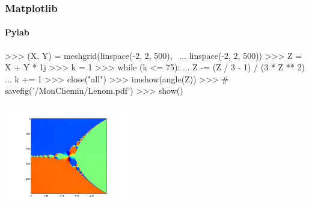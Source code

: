 \begin{frame}[fragile]
\frametitle{Matplotlib}
\framesubtitle{Pylab}
\begin{minipage}{0.58\linewidth}
\begin{pythonConsole}
>>> (X, Y) = meshgrid(linspace(-2, 2, 500), \
... linspace(-2, 2, 500))
>>> Z = X + Y * 1j
>>> k = 1
>>> while (k <= 75):
...    Z -= (Z / 3 - 1) / (3 * Z ** 2)
...	   k += 1
>>> close("all")	
>>> imshow(angle(Z))
>>> # savefig('/MonChemin/Lenom.pdf')
>>> show()
\end{pythonConsole}
\end{minipage}
\begin{minipage}{0.4\linewidth}
\includegraphics[width=5.5cm,height=4.5cm]{fig/fractal.png}
\end{minipage}
\end{frame}
